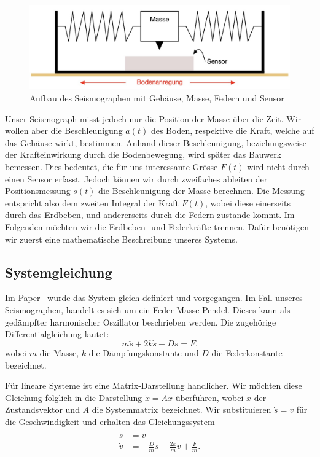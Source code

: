 \begin{figure}
 \begin{center}
 \includegraphics[width=\linewidth,keepaspectratio]{papers/erdbeben/Apperatur}
 \caption{Aufbau des Seismographen mit Gehäuse, Masse, Federn und Sensor}
 \label{erdbeben:Seismograph}
 \end{center}
\end{figure}

Unser Seismograph misst jedoch nur die Position der Masse über die Zeit. 
Wir wollen aber die Beschleunigung $a(t)$ des Boden,
respektive die Kraft,
welche auf das Gehäuse wirkt, bestimmen.  
Anhand dieser Beschleunigung,
beziehungsweise der Krafteinwirkung durch die Bodenbewegung,
wird später das Bauwerk bemessen.
Dies bedeutet, die für uns interessante Grösse $F(t)$ wird nicht durch einen Sensor erfasst. 
Jedoch können wir durch zweifaches ableiten der Positionsmessung $s(t)$ die Beschleunigung der Masse berechnen. 
Die Messung entspricht also dem zweiten Integral der Kraft $F(t)$,
wobei diese einerseits durch das Erdbeben, und andererseits durch die Federn zustande kommt.
Im Folgenden möchten wir die Erdbeben- und Federkräfte trennen.
Dafür benötigen wir zuerst eine mathematische Beschreibung unseres Systems.

\subsection{Systemgleichung}
Im Paper~\cite{erdbeben:mueller2008deconvolving} wurde das System gleich definiert und vorgegangen. 
Im Fall unseres Seismographen, handelt es sich um ein Feder-Masse-Pendel.
Dieses kann als gedämpfter harmonischer Oszillator beschrieben werden. 
Die zugehörige Differentialgleichung lautet:
\begin{equation}
	\label{erdbeben:Systemgleichung}
m\ddot s + 2k \dot s + Ds = F.
\end{equation}
wobei $m$ die Masse, $k$ die Dämpfungskonstante und $D$ die Federkonstante bezeichnet.

Für lineare Systeme ist eine Matrix-Darstellung handlicher.
Wir möchten diese Gleichung folglich in die Darstellung $\dot x = Ax$ überführen,
wobei $x$ der Zustandsvektor und $A$ die Systemmatrix bezeichnet.
Wir substituieren $\dot s = v$ für die Geschwindigkeit und erhalten das Gleichungssystem
\begin{align}
  \begin{split}
    \dot s &= v \\ 
    \dot v &= -\frac{D}{m} {s} -\frac{2k}{m} {v} + \frac{F} {m}.
  \end{split}
  \label{erdbenen:systemgleichungen}
\end{align}

